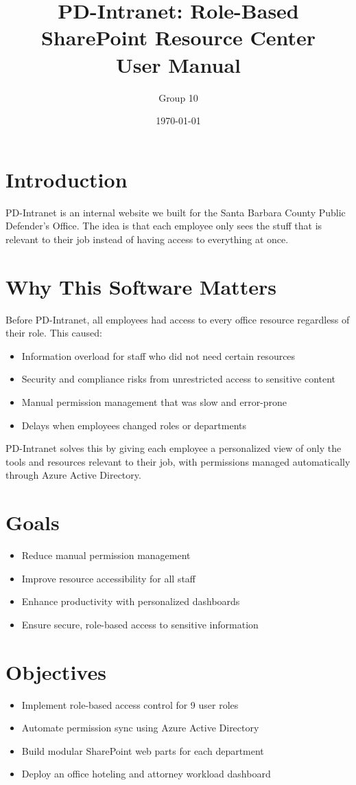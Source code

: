 \documentclass[12pt]{article}
\title{PD-Intranet: Role-Based SharePoint Resource Center \\ \large User Manual}
\author{Group 10}
\date{\today}
\begin{document}
\maketitle
\tableofcontents
\newpage

\section{Introduction}
PD-Intranet is an internal website we built for the Santa Barbara County Public Defender's Office. The idea is that each employee only sees the stuff that is relevant to their job instead of having access to everything at once.

\section{Why This Software Matters}
Before PD-Intranet, all employees had access to every office resource regardless of their role. This caused:
\begin{itemize}
    \item Information overload for staff who did not need certain resources
    \item Security and compliance risks from unrestricted access to sensitive content
    \item Manual permission management that was slow and error-prone
    \item Delays when employees changed roles or departments
\end{itemize}
PD-Intranet solves this by giving each employee a personalized view of only the tools and resources relevant to their job, with permissions managed automatically through Azure Active Directory.

\section{Goals}
\begin{itemize}
    \item Reduce manual permission management
    \item Improve resource accessibility for all staff
    \item Enhance productivity with personalized dashboards
    \item Ensure secure, role-based access to sensitive information
\end{itemize}

\section{Objectives}
\begin{itemize}
    \item Implement role-based access control for 9 user roles
    \item Automate permission sync using Azure Active Directory
    \item Build modular SharePoint web parts for each department
    \item Deploy an office hoteling and attorney workload dashboard
\end{itemize}
\end{document}
